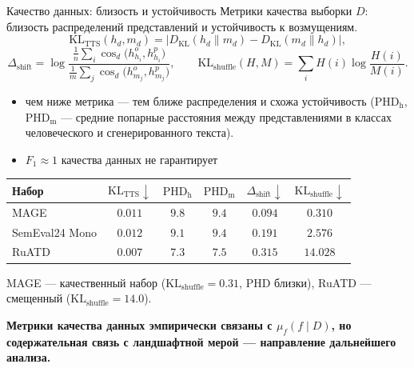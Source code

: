 \documentclass[9pt,pdf,hyperref={unicode}]{beamer}
\newcommand{\key}[1]{\par\vspace{0.5ex}\noindent\textbf{\color{darkgreen}#1}}
\begin{document}
\begin{frame}{Качество данных: близость и устойчивость}
\justifying
\small
Метрики качества выборки $D$: близость распределений представлений и устойчивость к возмущениям.
\[
    \mathrm{KL}_{\mathrm{TTS}}(h_d,m_d)=\bigl|D_{\mathrm{KL}}(h_d\|m_d)-D_{\mathrm{KL}}(m_d\|h_d)\bigr|,
\]
\[
    \Delta_{\mathrm{shift}}=\log\frac{\frac{1}{n}\sum_i\cos_d\bigl(h^o_{h_i},h^p_{h_i}\bigr)}{\frac{1}{m}\sum_j\cos_d\bigl(h^o_{m_j},h^p_{m_j}\bigr)},\qquad
    \mathrm{KL}_{\mathrm{shuffle}}(H,M)=\sum_i H(i)\log\frac{H(i)}{M(i)}.
\]
\smallskip
\begin{itemize}
    \item чем ниже метрика --- тем ближе распределения и схожа устойчивость ($\mathrm{PHD}_{\mathrm{h}}$, $\mathrm{PHD}_{\mathrm{m}}$ --- средние попарные расстояния между представлениями в классах человеческого и сгенерированного текста).
    \item $F_1\approx1$ качества данных не гарантирует
\end{itemize}
\begin{center}
{\scriptsize\setlength{\tabcolsep}{4pt}
\begin{tabular}{@{}lccccc@{}}
\hline
Набор & $\mathrm{KL}_{\mathrm{TTS}}\downarrow$ & $\mathrm{PHD}_{\mathrm{h}}$ & $\mathrm{PHD}_{\mathrm{m}}$ & $\Delta_{\mathrm{shift}}\downarrow$ & $\mathrm{KL}_{\mathrm{shuffle}}\downarrow$ \\
\hline
MAGE & $\mathbf{0.011}$ & $9.8$ & $9.4$ & $0.094$ & $\mathbf{0.310}$ \\
SemEval24 Mono & $\mathbf{0.012}$ & $9.1$ & $9.4$ & $0.191$ & $2.576$ \\
RuATD & $0.007$ & $7.3$ & $7.5$ & $0.315$ & $14.028$ \\
\hline
\end{tabular}}
\end{center}
\smallskip
MAGE --- качественный набор ($\mathrm{KL}_{\mathrm{shuffle}}=0.31$, PHD близки), RuATD --- смещенный ($\mathrm{KL}_{\mathrm{shuffle}}=14.0$).
\key{Метрики качества данных эмпирически связаны с $\mu_f(f\mid D)$, но содержательная связь с ландшафтной мерой --- направление дальнейшего анализа.}
\end{frame}

\end{document}

